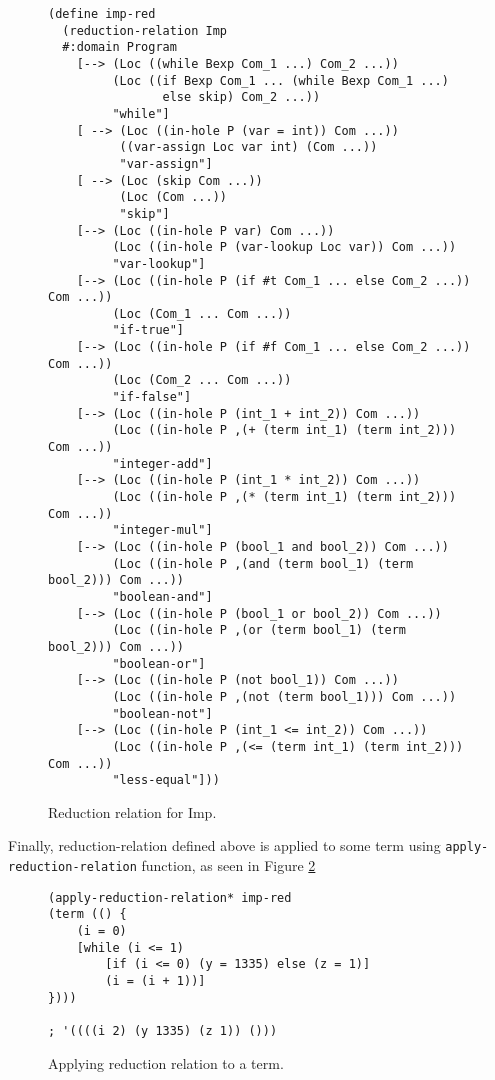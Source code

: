 \begin{figure}[ht]
\begin{verbatim}
(define imp-red
  (reduction-relation Imp
  #:domain Program
    [--> (Loc ((while Bexp Com_1 ...) Com_2 ...))
         (Loc ((if Bexp Com_1 ... (while Bexp Com_1 ...)
                else skip) Com_2 ...))
         "while"]
    [ --> (Loc ((in-hole P (var = int)) Com ...))
          ((var-assign Loc var int) (Com ...))
          "var-assign"]
    [ --> (Loc (skip Com ...))
          (Loc (Com ...))
          "skip"]
    [--> (Loc ((in-hole P var) Com ...))
         (Loc ((in-hole P (var-lookup Loc var)) Com ...))
         "var-lookup"]
    [--> (Loc ((in-hole P (if #t Com_1 ... else Com_2 ...)) Com ...))
         (Loc (Com_1 ... Com ...))
         "if-true"]
    [--> (Loc ((in-hole P (if #f Com_1 ... else Com_2 ...)) Com ...))
         (Loc (Com_2 ... Com ...))
         "if-false"]
    [--> (Loc ((in-hole P (int_1 + int_2)) Com ...))
         (Loc ((in-hole P ,(+ (term int_1) (term int_2))) Com ...))
         "integer-add"]
    [--> (Loc ((in-hole P (int_1 * int_2)) Com ...))
         (Loc ((in-hole P ,(* (term int_1) (term int_2))) Com ...))
         "integer-mul"]
    [--> (Loc ((in-hole P (bool_1 and bool_2)) Com ...))
         (Loc ((in-hole P ,(and (term bool_1) (term bool_2))) Com ...))
         "boolean-and"]
    [--> (Loc ((in-hole P (bool_1 or bool_2)) Com ...))
         (Loc ((in-hole P ,(or (term bool_1) (term bool_2))) Com ...))
         "boolean-or"]
    [--> (Loc ((in-hole P (not bool_1)) Com ...))
         (Loc ((in-hole P ,(not (term bool_1))) Com ...))
         "boolean-not"]
    [--> (Loc ((in-hole P (int_1 <= int_2)) Com ...))
         (Loc ((in-hole P ,(<= (term int_1) (term int_2))) Com ...))
         "less-equal"]))
\end{verbatim}
\caption{Reduction relation for Imp.}
\label{imp-define-red}
\end{figure}

Finally, reduction-relation defined above is applied to some term using \texttt{apply-reduction-relation} function, as seen in Figure \ref{imp-red-apply}

\begin{figure}[ht]
\begin{verbatim}
(apply-reduction-relation* imp-red
(term (() {
	(i = 0)
	[while (i <= 1)
		[if (i <= 0) (y = 1335) else (z = 1)]
		(i = (i + 1))]
})))

; '((((i 2) (y 1335) (z 1)) ()))
\end{verbatim}
\caption{Applying reduction relation to a term.}
\label{imp-red-apply}
\end{figure}
